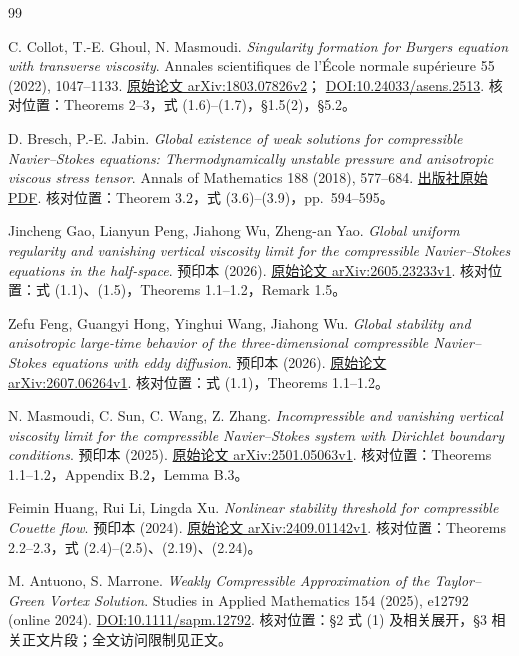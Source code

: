 \clearpage
\begin{thebibliography}{99}
\raggedright
{}
C. Collot, T.-E. Ghoul, N. Masmoudi.
\emph{Singularity formation for Burgers equation with transverse viscosity}.
Annales scientifiques de l'\'Ecole normale sup\'erieure 55 (2022), 1047--1133.
\href{https://arxiv.org/pdf/1803.07826}{原始论文 arXiv:1803.07826v2}；
\href{https://doi.org/10.24033/asens.2513}{DOI:10.24033/asens.2513}.
核对位置：Theorems 2--3，式 (1.6)--(1.7)，\S1.5(2)，\S5.2。

D. Bresch, P.-E. Jabin.
\emph{Global existence of weak solutions for compressible Navier--Stokes equations: Thermodynamically unstable pressure and anisotropic viscous stress tensor}.
Annals of Mathematics 188 (2018), 577--684.
\href{https://annals.math.princeton.edu/wp-content/uploads/annals-v188-n2-p04-p.pdf}{出版社原始 PDF}.
核对位置：Theorem 3.2，式 (3.6)--(3.9)，pp.~594--595。

Jincheng Gao, Lianyun Peng, Jiahong Wu, Zheng-an Yao.
\emph{Global uniform regularity and vanishing vertical viscosity limit for the compressible Navier--Stokes equations in the half-space}.
预印本 (2026).
\href{https://arxiv.org/html/2605.23233v1}{原始论文 arXiv:2605.23233v1}.
核对位置：式 (1.1)、(1.5)，Theorems 1.1--1.2，Remark 1.5。

Zefu Feng, Guangyi Hong, Yinghui Wang, Jiahong Wu.
\emph{Global stability and anisotropic large-time behavior of the three-dimensional compressible Navier--Stokes equations with eddy diffusion}.
预印本 (2026).
\href{https://arxiv.org/html/2607.06264v1}{原始论文 arXiv:2607.06264v1}.
核对位置：式 (1.1)，Theorems 1.1--1.2。

N. Masmoudi, C. Sun, C. Wang, Z. Zhang.
\emph{Incompressible and vanishing vertical viscosity limit for the compressible Navier--Stokes system with Dirichlet boundary conditions}.
预印本 (2025).
\href{https://arxiv.org/html/2501.05063v1}{原始论文 arXiv:2501.05063v1}.
核对位置：Theorems 1.1--1.2，Appendix B.2，Lemma B.3。

Feimin Huang, Rui Li, Lingda Xu.
\emph{Nonlinear stability threshold for compressible Couette flow}.
预印本 (2024).
\href{https://arxiv.org/html/2409.01142v1}{原始论文 arXiv:2409.01142v1}.
核对位置：Theorems 2.2--2.3，式 (2.4)--(2.5)、(2.19)、(2.24)。

M. Antuono, S. Marrone.
\emph{Weakly Compressible Approximation of the Taylor--Green Vortex Solution}.
Studies in Applied Mathematics 154 (2025), e12792 (online 2024).
\href{https://doi.org/10.1111/sapm.12792}{DOI:10.1111/sapm.12792}.
核对位置：\S2 式 (1) 及相关展开，\S3 相关正文片段；全文访问限制见正文。


\end{thebibliography}

